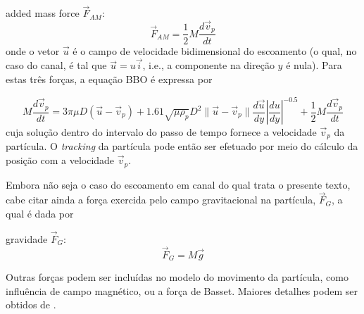 added mass force $\vec{F}_{AM}$:
\begin{equation}
\vec{F}_{AM} = \frac{1}{2}M\frac{d\vec{v}_p}{dt}
\end{equation}
onde o vetor $\vec{u}$ é o campo de velocidade bidimensional do escoamento (o qual, no caso do canal, é tal que $\vec{u}=u\vec{i}$, i.e., a componente na direção $y$ é nula). Para estas três forças, a equação BBO é expressa por

\begin{equation}
	M\frac{d\vec{v}_p}{dt} = 
	3\pi\mu D(\vec{u}-\vec{v}_p)
	+1.61\sqrt{\mu\rho_p}D^2\parallel\vec{u}-\vec{v}_p\parallel\frac{d\vec{u}}{dy}\left|\frac{du}{dy}\right|^{-0.5}
	+\frac{1}{2}M\frac{d\vec{v}_p}{dt}
\end{equation}
cuja solução dentro do intervalo do passo de tempo fornece a velocidade $\vec{v}_p$ da partícula. O {\it tracking} da partícula pode então ser efetuado por meio do cálculo da posição com a velocidade $\vec{v}_p$.

Embora não seja o caso do escoamento em canal do qual trata o presente texto, cabe citar ainda a força exercida pelo campo gravitacional na partícula, $\vec{F}_G$, a qual é dada por

gravidade $\vec{F}_G$:
\begin{equation}
	\vec{F}_G = M\vec{g}
\end{equation}

Outras forças podem ser incluídas no modelo do movimento da partícula, como influência de campo magnético, ou a força de Basset. Maiores detalhes podem ser obtidos de \citet{crowe2012}.


